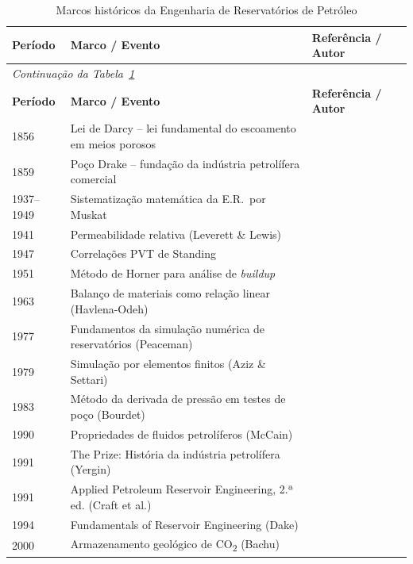 \documentclass[
  12pt,
  a4paper,
  oneside,
  brazilian,
  sumario=tradicional
]{abntex2}
\begin{document}
\clearpage
\setlength{\tabcolsep}{2pt}
\renewcommand{\arraystretch}{1.2}
\begin{longtable}{p{1.8cm} p{5.0cm} p{5.2cm}}
\caption{Marcos históricos da Engenharia de Reservatórios de Petróleo}
\label{tab:marcos}\\
\toprule
\textbf{Período} & \textbf{Marco / Evento} & \textbf{Referência / Autor} \\
\midrule
\endfirsthead
\multicolumn{3}{l}{\small\itshape Continuação da Tabela~\ref{tab:marcos}}\\
\toprule
\textbf{Período} & \textbf{Marco / Evento} & \textbf{Referência / Autor} \\
\midrule
\endhead
\bottomrule
\endfoot
\bottomrule
\endlastfoot
\small
1856       & Lei de Darcy -- lei fundamental do escoamento em meios porosos & \cite{dake2014} \\
1859       & Poço Drake -- fundação da indústria petrolífera comercial & \cite{yergin1991} \\
1937--1949 & Sistematização matemática da E.R.\ por Muskat & \cite{muskat1949} \\
1941       & Permeabilidade relativa (Leverett \& Lewis) & \cite{rosa2006} \\
1947       & Correlações PVT de Standing & \cite{mccain1990} \\
1951       & Método de Horner para análise de \textit{buildup} & \cite{dake2014} \\
1963       & Balanço de materiais como relação linear (Havlena-Odeh) & \cite{havlena1963} \\
1977       & Fundamentos da simulação numérica de reservatórios (Peaceman) & \cite{peaceman1977} \\
1979       & Simulação por elementos finitos (Aziz \& Settari) & \cite{aziz1979} \\
1983       & Método da derivada de pressão em testes de poço (Bourdet) & \cite{bourdet1989} \\
1990       & Propriedades de fluidos petrolíferos (McCain) & \cite{mccain1990} \\
1991       & The Prize: História da indústria petrolífera (Yergin) & \cite{yergin1991} \\
1991       & Applied Petroleum Reservoir Engineering, 2.ª ed. (Craft et al.) & \cite{craft1991} \\
1994       & Fundamentals of Reservoir Engineering (Dake) & \cite{dake1994} \\
2000       & Armazenamento geológico de CO\textsubscript{2} (Bachu) & \cite{bachu2000} \\

\end{longtable}
\end{document}
